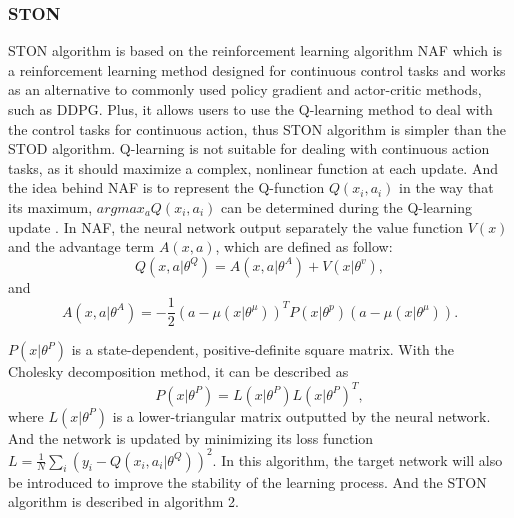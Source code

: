 \documentclass[journal]{IEEEtran}
\begin{document}
\subsubsection{STON}
STON algorithm is based on the reinforcement learning algorithm NAF which is a reinforcement learning method designed for continuous control tasks and works as an alternative to commonly used policy gradient and actor-critic methods, such as DDPG. Plus, it allows users to use the Q-learning method to deal with the control tasks for continuous action, thus STON algorithm is simpler than the STOD algorithm. Q-learning is not suitable for dealing with continuous action tasks, as it should maximize a complex, nonlinear function at each update. And the idea behind NAF is to represent the Q-function \(Q(x_i,a_i)\) in the way that its maximum, \(argmax_a Q(x_i, a_i)\) can be determined during the Q-learning update \cite{gu2016continuous}. In NAF, the neural network output separately the value function \(V(x)\) and the advantage term \(A(x,a)\), which are defined as follow:
\begin{equation}
Q(x,a|\theta^Q) = A(x,a|\theta^A) + V(x|\theta^v),
\end{equation}
and
\begin{equation}
A(x,a|\theta^A) = - \frac{1}{2} (a-\mu(x|\theta^{\mu}))^T P(x|\theta^{p})(a-\mu(x|\theta^{\mu})).
\end{equation}
\par \(P(x|\theta^P)\) is a state-dependent, positive-definite square matrix. With the Cholesky decomposition method, it can be described as
\begin{equation}
P(x|\theta^P) = L(x|\theta^P)L(x|\theta^P)^T,
\end{equation}
where \(L(x|\theta^P)\) is a lower-triangular matrix outputted by the neural network. And the network is updated by minimizing its loss function \(L=\frac{1}{N}\sum_{i}(y_i - Q(x_i, a_i|\theta^Q))^2\). In this algorithm, the target network will also be introduced to improve the stability of the learning process. And the STON algorithm is described in algorithm 2.
\end{document}
